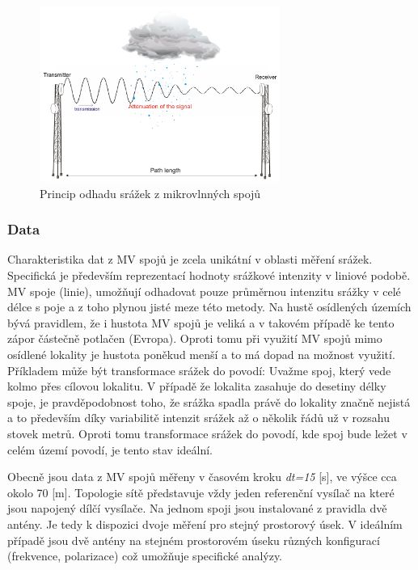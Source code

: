 \documentclass[a4paper,12pt,oneside]{report}
\begin{document}
\begin{figure}[h!]
    \centering
    \includegraphics[width=0.7\textwidth]{./img/srazky/microwave_link.png}
    \caption[MV linky]{\centering  Princip odhadu srážek z mikrovlnných spojů }
 \end{figure}   

\subsubsection{Data}
Charakteristika dat z MV spojů je zcela unikátní v oblasti měření srážek. Specifická je především reprezentací hodnoty srážkové intenzity v liniové podobě. MV spoje (linie), umožňují odhadovat pouze průměrnou intenzitu srážky v celé délce s poje a z toho plynou jisté meze této metody. Na hustě osídlených územích  bývá pravidlem, že i hustota MV spojů je veliká a v takovém případě ke tento zápor částečně potlačen (Evropa). Oproti tomu při využití MV spojů mimo osídlené lokality je hustota poněkud menší a to má dopad na možnost využití. Příkladem může být transformace srážek do povodí: Uvažme spoj, který vede kolmo přes cílovou lokalitu. V případě že lokalita zasahuje do desetiny délky spoje, je pravděpodobnost toho, že srážka spadla právě do lokality značně nejistá a to především díky variabilitě intenzit srážek  až o několik řádů už v rozsahu stovek metrů. 
Oproti tomu transformace srážek do povodí, kde spoj bude ležet v celém území povodí, je tento stav ideální. 

Obecně jsou data z MV spojů měřeny v časovém kroku \emph{dt=15} [s], ve výšce cca okolo 70 [m]. Topologie sítě představuje vždy jeden referenční vysílač na které jsou napojený dílčí vysílače. Na jednom spoji jsou instalované z pravidla dvě antény. Je tedy k dispozici dvoje měření pro stejný prostorový úsek. V ideálním případě jsou dvě antény na stejném prostorovém úseku různých konfigurací (frekvence, polarizace) což umožňuje specifické analýzy.
\end{document}
